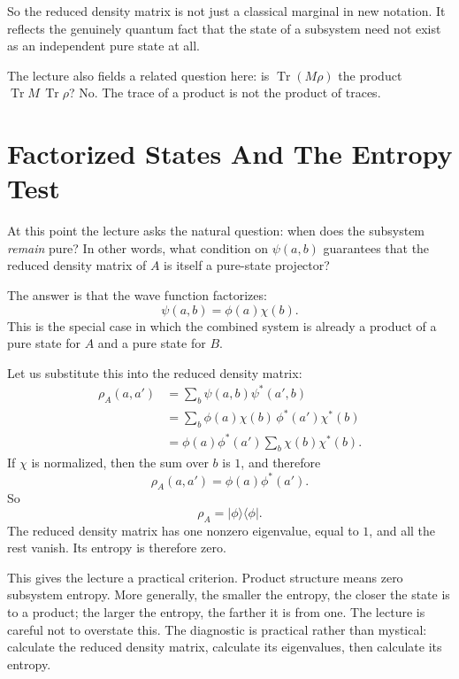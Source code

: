 So the reduced density matrix is not just a classical marginal in new notation. It reflects the genuinely quantum fact that the state of a subsystem need not exist as an independent pure state at all.

The lecture also fields a related question here: is \(\operatorname{Tr}(M\rho)\) the product \(\operatorname{Tr} M\, \operatorname{Tr}\rho\)? No. The trace of a product is not the product of traces.

\section{Factorized States And The Entropy Test}

At this point the lecture asks the natural question: when does the subsystem \emph{remain} pure? In other words, what condition on \(\psi(a,b)\) guarantees that the reduced density matrix of \(A\) is itself a pure-state projector?

The answer is that the wave function factorizes:
\begin{equation}
\psi(a,b)=\phi(a)\chi(b).
\end{equation}
This is the special case in which the combined system is already a product of a pure state for \(A\) and a pure state for \(B\).

Let us substitute this into the reduced density matrix:
\begin{align}
\rho_A(a,a')
&= \sum_b \psi(a,b)\psi^*(a',b) \\
&= \sum_b \phi(a)\chi(b)\,\phi^*(a')\chi^*(b) \\
&= \phi(a)\phi^*(a')\sum_b \chi(b)\chi^*(b).
\end{align}
If \(\chi\) is normalized, then the sum over \(b\) is \(1\), and therefore
\begin{equation}
\rho_A(a,a')=\phi(a)\phi^*(a').
\end{equation}
So
\begin{equation}
\rho_A = |\phi\rangle\langle\phi|.
\end{equation}
The reduced density matrix has one nonzero eigenvalue, equal to \(1\), and all the rest vanish. Its entropy is therefore zero.

This gives the lecture a practical criterion. Product structure means zero subsystem entropy. More generally, the smaller the entropy, the closer the state is to a product; the larger the entropy, the farther it is from one. The lecture is careful not to overstate this. The diagnostic is practical rather than mystical: calculate the reduced density matrix, calculate its eigenvalues, then calculate its entropy.


